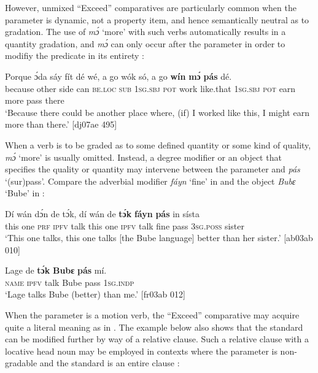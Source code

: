 However, unmixed “Exceed” comparatives are particularly common when the parameter is dynamic, not a property item, and hence semantically neutral as to gradation. The use of \textit{mɔ́} ‘more’ with such verbs automatically results in a quantity gradation, and \textit{mɔ́} can only occur after the parameter in order to modifiy the predicate in its entirety :


\ea%
    \label{ex:key:476}
    \gll Porque  ɔ́da    sáy  fít  dé    wé,  a    go  wók    só,
a    go  \textbf{wín}   \textbf{mɔ́}    \textbf{pás}   dé.\\
because  other  side  can  \textsc{be.loc}  \textsc{sub}  \textsc{1sg.sbj}  \textsc{pot}  work  like.that
\textsc{1sg.sbj}  \textsc{pot}  earn    more  pass    there\\

\glt ‘Because there could be another place where, (if) I worked like this,
I might earn more than there.’ [dj07ae 495]
\z

When a verb is to be graded as to some defined quantity or some kind of quality, \textit{mɔ́} ‘more’ is usually omitted. Instead, a degree modifier or an object that specifies the quality or quantity may intervene between the parameter and \textit{pás} ‘(sur)pass’. Compare the adverbial modifier \textit{fáyn} ‘fine’ in  and the object \textit{Bubɛ} ‘Bube’ in :


\ea%
    \label{ex:key:477}
    \gll Dí  wán  dɔ́n  de  tɔ́k,  dí  wán  de  \textbf{tɔ́k}  \textbf{fáyn}  
\textbf{pás}   in    sísta\\
this  one  \textsc{prf}  \textsc{ipfv}  talk  this  one  \textsc{ipfv}  talk  fine  
pass    \textsc{3sg.poss}  sister\\

\glt ‘This one talks, this one talks [the Bube language] 
better than her sister.’ [ab03ab 010]
\z


\ea%
    \label{ex:key:478}
    \gll Lage    de  \textbf{tɔ́k}  \textbf{Bubɛ}  \textbf{pás}  mí.\\
\textsc{name}  \textsc{ipfv}  talk  Bube  pass  \textsc{1sg.indp}\\

\glt ‘Lage talks Bube (better) than me.’ [fr03ab 012]
\z

When the parameter is a motion verb, the “Exceed” comparative may acquire quite a literal meaning as in . The example below also shows that the standard can be modified further by way of a relative clause. Such a relative clause with a locative head noun may be employed in contexts where the parameter is non-gradable and the standard is an entire clause :


